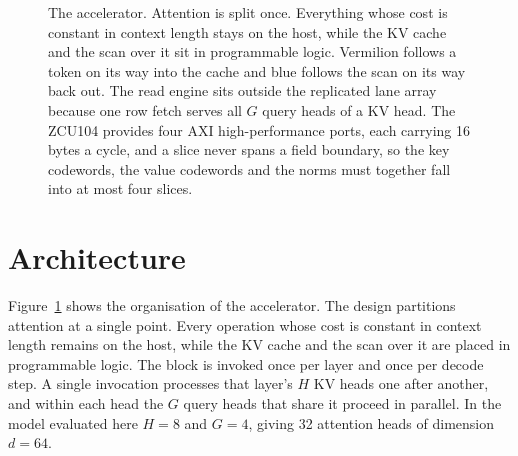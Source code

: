 %
%
%
%

\begin{figure}[t]
  \centering
  
  \caption{The accelerator. Attention is split once. Everything whose
  cost is constant in context length stays on the host, while the KV
  cache and the scan over it sit in programmable logic. Vermilion
  follows a token on its way into the cache and blue follows the scan on
  its way back out. The read engine sits outside the replicated lane
  array because one row fetch serves all $G$ query heads of a KV head.
  The ZCU104 provides four AXI high-performance ports, each carrying 16
  bytes a cycle, and a slice never spans a field boundary, so the key
  codewords, the value codewords and the norms must together fall into
  at most four slices.}
  \label{fig:hw}
\end{figure}

\section{Architecture}
\label{sec:arch}

Figure~\ref{fig:hw} shows the organisation of the accelerator. The design
partitions attention at a single point. Every operation whose cost is
constant in context length remains on the host, while the KV cache and
the scan over it are placed in programmable logic. The block is invoked
once per layer and once per decode step. A single invocation processes
that layer's $H$ KV heads one after another, and within each head the
$G$ query heads that share it proceed in parallel. In the model
evaluated here $H{=}8$ and $G{=}4$, giving 32 attention heads of
dimension $d{=}64$.

